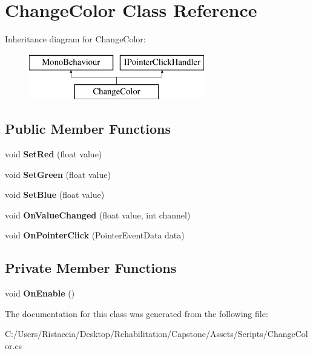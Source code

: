 \hypertarget{class_change_color}{}\section{Change\+Color Class Reference}
\label{class_change_color}
Inheritance diagram for Change\+Color\+:\begin{figure}[H]
\begin{center}
\leavevmode
\includegraphics[height=2.000000cm]{class_change_color}
\end{center}
\end{figure}
\subsection*{Public Member Functions}
\begin{DoxyCompactItemize}
\item 
\mbox{\label{class_change_color_ac6970765c24e5ce6a3d13445177e4e02}} 
void {\bfseries Set\+Red} (float value)
\item 
\mbox{\label{class_change_color_a427f62842961a096691110b1636e6750}} 
void {\bfseries Set\+Green} (float value)
\item 
\mbox{\label{class_change_color_aceb17e3e8e2b3fd419c0bfae0b39e9e8}} 
void {\bfseries Set\+Blue} (float value)
\item 
\mbox{\label{class_change_color_a262e8b804e2bfbcd6b74f070f7bfd4bd}} 
void {\bfseries On\+Value\+Changed} (float value, int channel)
\item 
\mbox{\label{class_change_color_a491412e7a69ea84541308ea1397c5cff}} 
void {\bfseries On\+Pointer\+Click} (Pointer\+Event\+Data data)
\end{DoxyCompactItemize}
\subsection*{Private Member Functions}
\begin{DoxyCompactItemize}
\item 
\mbox{\label{class_change_color_acb5d8d221df694135a5e04be7972467c}} 
void {\bfseries On\+Enable} ()
\end{DoxyCompactItemize}


The documentation for this class was generated from the following file\+:\begin{DoxyCompactItemize}
\item 
C\+:/\+Users/\+Ristaccia/\+Desktop/\+Rehabilitation/\+Capstone/\+Assets/\+Scripts/Change\+Color.\+cs\end{DoxyCompactItemize}

